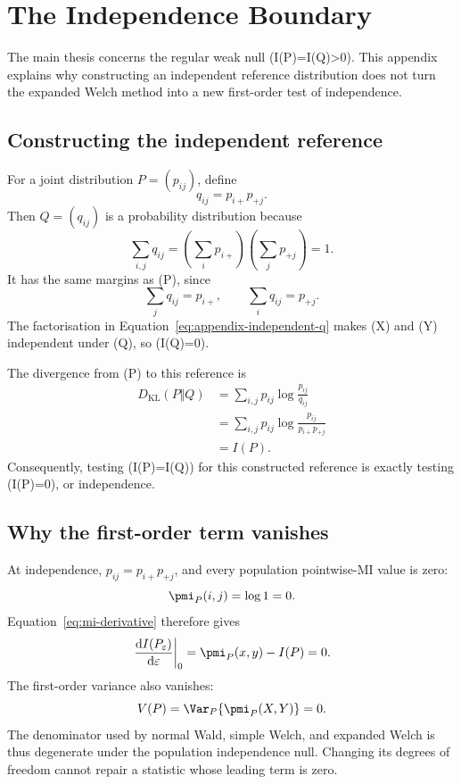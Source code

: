 \chapter{The Independence Boundary}
\label{app:independence-boundary}

The main thesis concerns the regular weak null (I(P)=I(Q)>0). This appendix
explains why constructing an independent reference distribution does not turn
the expanded Welch method into a new first-order test of independence.

\section{Constructing the independent reference}

For a joint distribution $P=(p_{ij})$, define
\begin{equation}
  q_{ij}=p_{i+}p_{+j}.
  \label{eq:appendix-independent-q}
\end{equation}
Then $Q=(q_{ij})$ is a probability distribution because
\begin{equation}
  \sum_{i,j}q_{ij}
  =\left(\sum_i p_{i+}\right)
   \left(\sum_j p_{+j}\right)=1.
\end{equation}
It has the same margins as (P), since
\begin{equation}
  \sum_jq_{ij}=p_{i+},
  \qquad
  \sum_iq_{ij}=p_{+j}.
\end{equation}
The factorisation in Equation~\eqref{eq:appendix-independent-q} makes (X)
and (Y) independent under (Q), so (I(Q)=0).

The divergence from (P) to this reference is
\begin{align}
  D_{\mathrm{KL}}(P\Vert Q)
  &=\sum_{i,j}p_{ij}\log\frac{p_{ij}}{q_{ij}}\\
  &=\sum_{i,j}p_{ij}\log\frac{p_{ij}}{p_{i+}p_{+j}}\\
  &=I(P).
\end{align}
Consequently, testing (I(P)=I(Q)) for this constructed reference is exactly
testing (I(P)=0), or independence.

\section{Why the first-order term vanishes}

At independence, $p_{ij}=p_{i+}p_{+j}$, and every population pointwise-MI
value is zero:
\begin{equation}
  \pmi_P(i,j)=\log 1=0.
\end{equation}
Equation~\eqref{eq:mi-derivative} therefore gives
\begin{equation}
  \left.\frac{\mathrm d I(P_\varepsilon)}
  {\mathrm d\varepsilon}\right|_0
  =\pmi_P(x,y)-I(P)=0.
\end{equation}
The first-order variance also vanishes:
\begin{equation}
  V(P)=\Var_P\{\pmi_P(X,Y)\}=0.
\end{equation}
The denominator used by normal Wald, simple Welch, and expanded Welch is thus
degenerate under the population independence null. Changing its degrees of
freedom cannot repair a statistic whose leading term is zero.


